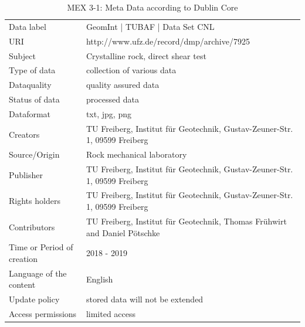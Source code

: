 \begin{table}[!ht]
\caption{MEX 3-1: Meta Data according to Dublin Core}
\label{tab:dms-mex3-1}
\small
\begin{tabular}{R{3cm}|L{7cm}}
\hline
%
Data label & GeomInt | TUBAF | Data Set CNL \\
URI & http://www.ufz.de/record/dmp/archive/7925 \\
Subject  & Crystalline rock, direct shear test \\
Type of data  & collection of various data \\
Dataquality  & quality assured data \\
Status of data  & processed data \\
Dataformat  & txt, jpg, png \\
Creators  & TU Freiberg, Institut für Geotechnik, Gustav-Zeuner-Str. 1, 09599 Freiberg \\
Source/Origin  & Rock mechanical laboratory \\
Publisher  & TU Freiberg, Institut für Geotechnik, Gustav-Zeuner-Str. 1, 09599 Freiberg \\
Rights holders  & TU Freiberg, Institut für Geotechnik, Gustav-Zeuner-Str. 1, 09599 Freiberg \\
Contributors  & TU Freiberg, Institut für Geotechnik, Thomas Fr\"uhwirt and Daniel P\"otschke \\
Time or Period of creation  & 2018 - 2019 \\
Language of the content & English \\
Update policy  & stored data will not be extended \\
Access permissions  & limited access \\
%
\hline
\end{tabular}
\end{table}